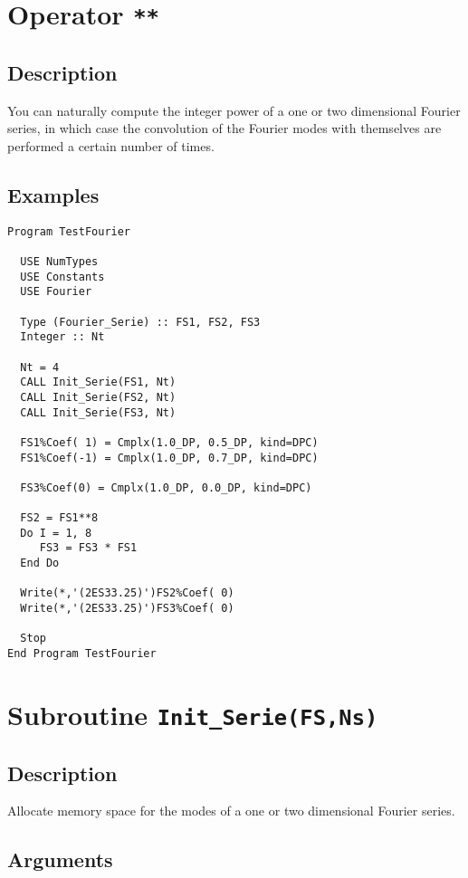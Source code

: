 \section{Operator \texttt{**}}

\subsection{Description}

You can naturally compute the integer power of a one or two
dimensional Fourier series, in which case the convolution of the
Fourier modes with themselves are performed a certain number of
times. 

\subsection{Examples}

\begin{verbatim}
Program TestFourier

  USE NumTypes
  USE Constants
  USE Fourier

  Type (Fourier_Serie) :: FS1, FS2, FS3
  Integer :: Nt

  Nt = 4
  CALL Init_Serie(FS1, Nt)
  CALL Init_Serie(FS2, Nt)
  CALL Init_Serie(FS3, Nt)

  FS1%Coef( 1) = Cmplx(1.0_DP, 0.5_DP, kind=DPC)
  FS1%Coef(-1) = Cmplx(1.0_DP, 0.7_DP, kind=DPC)

  FS3%Coef(0) = Cmplx(1.0_DP, 0.0_DP, kind=DPC)

  FS2 = FS1**8
  Do I = 1, 8
     FS3 = FS3 * FS1
  End Do

  Write(*,'(2ES33.25)')FS2%Coef( 0)
  Write(*,'(2ES33.25)')FS3%Coef( 0)

  Stop
End Program TestFourier
\end{verbatim}


\section{Subroutine \texttt{Init\_Serie(FS,Ns)}}
\label{sc:InitSerie}

\subsection{Description}

Allocate memory space for the modes of a one or two dimensional
Fourier series.

\subsection{Arguments}

